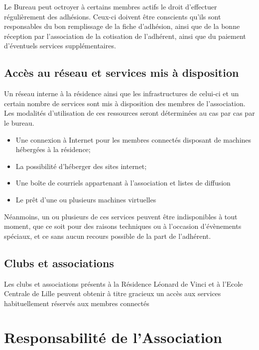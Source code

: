 \documentclass[12pt]{article}
\begin{document}
		Le Bureau peut octroyer à certains membres actifs le droit d’effectuer régulièrement des adhésions. Ceux-ci doivent être conscients qu’ils sont responsables du bon remplissage de la fiche d’adhésion, ainsi que de la bonne réception par l’association de la cotisation de l’adhérent, ainsi que du paiement d’éventuels services supplémentaires.

    \subsection{Accès au réseau et services mis à disposition}

		Un réseau interne à la résidence ainsi que les infrastructures de celui-ci et un certain nombre de services sont mis à disposition des membres de l'association. Les modalités d'utilisation de ces ressources seront déterminées au cas par cas par le bureau.

		\begin{itemize}
			 \item[\textbullet] Une connexion à Internet pour les membres connectés disposant de machines hébergées à la résidence;
			 \item[\textbullet] La possibilité d'héberger des sites internet;
			 \item[\textbullet] Une boîte de courriels appartenant à l'association et listes de diffusion
			 \item[\textbullet] Le prêt d'une ou plusieurs machines virtuelles
		 \end{itemize}

		Néanmoins, un ou plusieurs de ces services peuvent être indisponibles à tout moment, que ce soit pour des raisons techniques ou à l'occasion d'évènements spéciaux, et ce sans aucun recours possible de la part de l'adhérent.

    \subsection{Clubs et associations}

		Les clubs et associations présents à la Résidence Léonard de Vinci et à l'Ecole Centrale de Lille peuvent obtenir à titre gracieux un accès aux services habituellement réservés aux membres connectés

\section{Responsabilité de l'Association}
\end{document}
